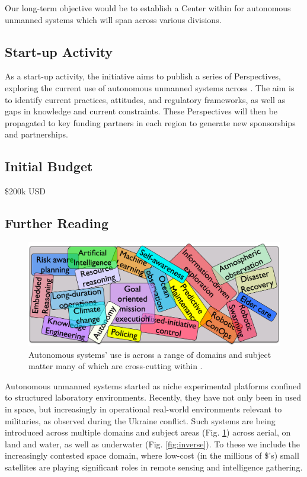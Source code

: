 \documentclass[11pt,letterpaper]{article}
\begin{document}
Our long-term objective would be to establish a Center within \org for autonomous unmanned systems which will span across various divisions.

\subsection{Start-up Activity}
As a start-up activity, the initiative aims to publish a series of Perspectives, exploring the current use of autonomous unmanned systems across \auke. The aim is to identify current practices, attitudes, and regulatory frameworks, as well as gaps in knowledge and current constraints. These Perspectives will then be propagated to key funding partners in each region to generate new sponsorships and partnerships. 

\subsection{Initial Budget}
\$200k USD

\pagebreak

\subsection{Further Reading}

\begin{figure}
  \vspace{-0.5cm}
  \centering
  \includegraphics[scale=0.06]{fig/word-bag.jpg}
  \caption{Autonomous systems' use is across a range of domains and
    subject matter many of which are cross-cutting within \orge.}
 \label{fig:topics}
\end{figure}

Autonomous unmanned systems started as niche experimental
platforms confined to structured laboratory environments. Recently, they have
not only been in used in space, but increasingly in operational
real-world environments relevant to militaries, as observed during the Ukraine conflict. Such systems are
being introduced across multiple domains and subject areas
(Fig. \ref{fig:topics}) across aerial, on land and water, as well as
underwater (Fig. \ref{fig:inverse}). To these we include the
increasingly contested space domain, where low-cost (in the millions
of \$'s) small satellites are playing significant roles in remote
sensing and intelligence gathering.
\end{document}
